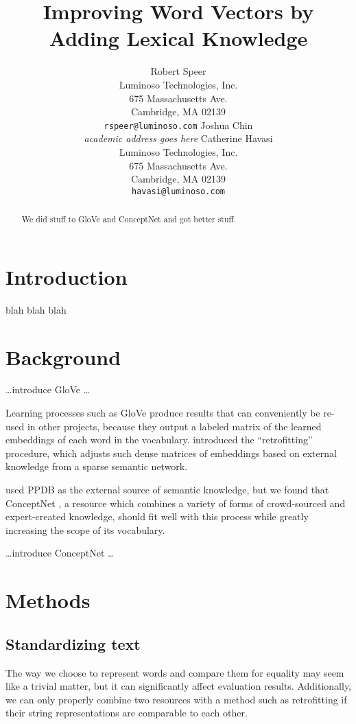 \documentclass[letterpaper]{article}
\title{Improving Word Vectors by Adding Lexical Knowledge}
\author{Robert Speer\\
    Luminoso Technologies, Inc.\\
    675 Massachusetts Ave.\\
    Cambridge, MA 02139\\
    \texttt{rspeer@luminoso.com}
\And
    Joshua Chin\\
    {\em academic address goes here}
\And
    Catherine Havasi\\
    Luminoso Technologies, Inc.\\
    675 Massachusetts Ave.\\
    Cambridge, MA 02139\\
    \texttt{havasi@luminoso.com}
}
\begin{document}
\maketitle
\begin{abstract}
We did stuff to GloVe and ConceptNet and got better stuff.
\end{abstract}

\section{Introduction}
blah blah blah

\section{Background}
\ldots introduce GloVe \ldots %

Learning processes such as GloVe produce results that can conveniently be
re-used in other projects, because they output a labeled matrix of the learned
embeddings of each word in the vocabulary.
\citeauthor{faruqui2014retrofitting} 
introduced the ``retrofitting'' procedure, which adjusts such dense matrices of
embeddings based on external knowledge from a sparse semantic network.

\citeauthor{faruqui2014retrofitting} used PPDB \cite{ganitkevitch2013ppdb} as
the external source of semantic knowledge, but we found that ConceptNet
\cite{speer2012conceptnet}, a resource which combines a variety of forms of
crowd-sourced and expert-created knowledge, should fit well with this process
while greatly increasing the scope of its vocabulary.

\ldots introduce ConceptNet \ldots %


\section{Methods}

\subsection{Standardizing text}


The way we choose to represent words and compare them for equality may seem
like a trivial matter, but it can significantly affect evaluation results.
Additionally, we can only properly combine two resources with a method such
as retrofitting if their string representations are comparable to each other.
\end{document}
